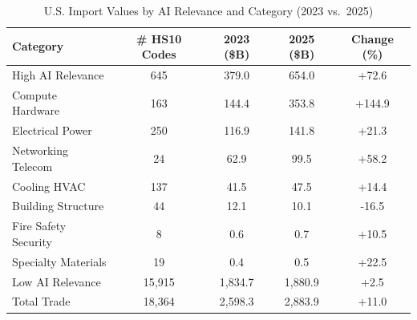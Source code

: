 \begin{table}[htbp]
\centering
\caption{U.S. Import Values by AI Relevance and Category (2023 vs.\ 2025)}
\label{tab:trade_hierarchical}
\setlength{\tabcolsep}{4.5mm}
\renewcommand{\arraystretch}{1.60}
{\small
\begin{tabular}{lcccc}
\toprule
Category & \# HS10 Codes & 2023 (\$B) & 2025 (\$B) & Change (\%) \\
\midrule
High AI Relevance & 645 & 379.0 & 654.0 & +72.6 \\
\quad\quad Compute Hardware & 163 & 144.4 & 353.8 & +144.9 \\
\quad\quad Electrical Power & 250 & 116.9 & 141.8 & +21.3 \\
\quad\quad Networking Telecom & 24 & 62.9 & 99.5 & +58.2 \\
\quad\quad Cooling HVAC & 137 & 41.5 & 47.5 & +14.4 \\
\quad\quad Building Structure & 44 & 12.1 & 10.1 & -16.5 \\
\quad\quad Fire Safety Security & 8 & 0.6 & 0.7 & +10.5 \\
\quad\quad Specialty Materials & 19 & 0.4 & 0.5 & +22.5 \\
Low AI Relevance & 15,915 & 1,834.7 & 1,880.9 & +2.5 \\
\midrule
Total Trade & 18,364 & 2,598.3 & 2,883.9 & +11.0 \\
\bottomrule
\end{tabular}}
\end{table}
